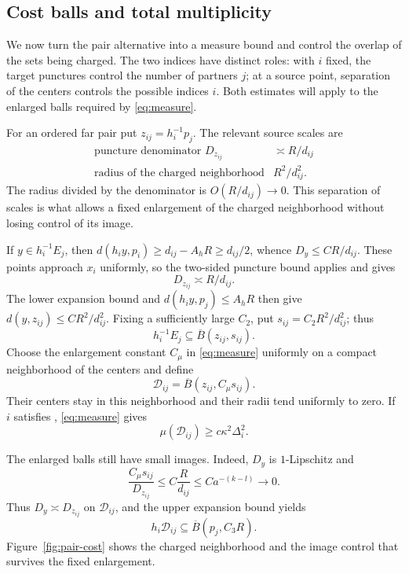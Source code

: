 \subsection{Cost balls and total multiplicity}

We now turn the pair alternative into a measure bound and control the
overlap of the sets being charged. The two indices have distinct roles:
with $i$ fixed, the target punctures control the number of partners $j$;
at a source point, separation of the centers controls the possible
indices $i$. Both estimates will apply to the enlarged balls required
by \eqref{eq:measure}.

For an ordered far pair put $z_{ij}=h_i^{-1}p_j$. The relevant source
scales are
\[
 \begin{array}{c|c}
 \text{puncture denominator }D_{z_{ij}}&\asymp R/d_{ij}\\
 \text{radius of the charged neighborhood}&R^2/d_{ij}^2.
 \end{array}
\]
The radius divided by the denominator is $O(R/d_{ij})\to0$. This separation of scales is what
allows a fixed enlargement of the charged neighborhood without losing
control of its image.

If $y\in h_i^{-1}E_j$, then
$d(h_i y,p_i)\ge d_{ij}-A_hR\ge d_{ij}/2$, whence
$D_y\le CR/d_{ij}$. These points approach $x_i$ uniformly, so the
two-sided puncture bound applies and gives
\begin{equation}
 D_{z_{ij}}\asymp R/d_{ij}.
 \label{eq:cost-denominator}
\end{equation}
The lower expansion bound and $d(h_i y,p_j)\le A_hR$ then give
$d(y,z_{ij})\le CR^2/d_{ij}^2$. Fixing a sufficiently large $C_2$, put
$s_{ij}=C_2R^2/d_{ij}^2$; thus
\begin{equation}
 h_i^{-1}E_j\subseteq\overline B(z_{ij},s_{ij}).
 \label{eq:cost-containment}
\end{equation}
Choose the enlargement constant $C_\mu$ in \eqref{eq:measure}
uniformly on a compact neighborhood of the centers and define
\[
 \mathcal D_{ij}=\overline B(z_{ij},C_\mu s_{ij}).
\]
Their centers stay in this neighborhood and their radii tend uniformly
to zero. If $i$ satisfies , \eqref{eq:measure} gives
\begin{equation}
 \mu(\mathcal D_{ij})\ge c\kappa^2\Delta_i^2.
 \label{eq:cost-lower-bound}
\end{equation}

The enlarged balls still have small images. Indeed, $D_y$ is
$1$-Lipschitz and
\[
 \frac{C_\mu s_{ij}}{D_{z_{ij}}}
 \le C\frac R{d_{ij}}\le Ca^{-(k-l)}\longrightarrow0.
\]
Thus $D_y\asymp D_{z_{ij}}$ on $\mathcal D_{ij}$, and the upper
expansion bound yields
\begin{equation}
 h_i\mathcal D_{ij}\subseteq\overline B(p_j,C_3R).
 \label{eq:cost-image}
\end{equation}
Figure~\ref{fig:pair-cost} shows the charged neighborhood and the image
control that survives the fixed enlargement.

